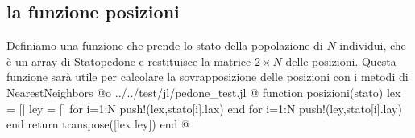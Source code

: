 \documentclass[]{article}
\begin{document}
\subsection{la funzione posizioni}
Definiamo una funzione che prende lo stato della popolazione di $N$ individui, che è un array di Statopedone e restituisce la matrice $2\times N$ delle posizioni.
Questa funzione sarà utile per calcolare la sovrapposizione delle posizioni con i metodi di NearestNeighbors
@o ../../test/jl/pedone_test.jl @{
 function posizioni(stato)
       lex = []
       ley = []
       for i=1:N
           push!(lex,stato[i].lax)
       end
       for i=1:N
           push!(ley,stato[i].lay)
       end
       return transpose([lex ley])
       end
@}


%
\end{document}

